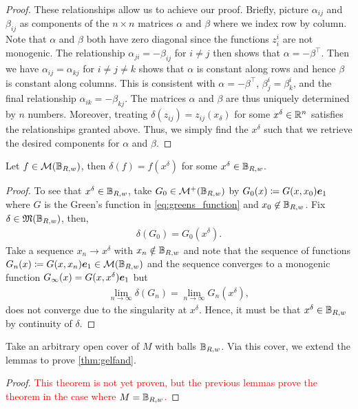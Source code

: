 \begin{proof}
These relationships allow us to achieve our proof. Briefly, picture $\alpha_{ij}$ and $\beta_{ij}$ as components of the $n \times n$ matrices $\alpha$ and $\beta$ where we index row by column. Note that $\alpha$ and $\beta$ both have zero diagonal since the functions $z_i^i$ are not monogenic. The relationship $\alpha_{ji} = -\beta_{ij}$ for $i\neq j$ then shows that $\alpha = -\beta^\top$.  Then we have $\alpha_{ij} = \alpha_{kj}$ for $i\neq j \neq k$ shows that $\alpha$ is constant along rows and hence $\beta$ is constant along columns. This is consistent with $\alpha = -\beta^\top$, $\beta_j^i = \beta_k^i$, and the final relationship $\alpha_{ik} = -\beta_{kj}$. The matrices $\alpha$ and $\beta$ are thus uniquely determined by $n$ numbers.  Moreover, treating $\delta(z_{ij})=z_{ij}(x_\delta)$ for some $x^\delta \in \mathbb{R}^n$ satisfies the relationships granted above. Thus, we simply find the $x^\delta$ such that we retrieve the desired components for $\alpha$ and $\beta$.  
\end{proof}


\begin{lemma}
Let $f\in \mathcal{M}(\mathbb{B}_{R,w})$, then $\delta(f)=f(x^\delta)$ for some $x^\delta \in \mathbb{B}_{R,w}$.
\end{lemma}
\begin{proof}
To see that $x^\delta \in \mathbb{B}_{R,w}$, take $G_0 \in \mathcal{M}^+(\mathbb{B}_{R,w})$ by $G_0(x)\coloneqq G(x,x_0)\boldsymbol{e}_1$ where $G$ is the Green's function in \cref{eq:greens_function} and $x_0\not\in \mathbb{B}_{R,w}$. Fix $\delta \in \mathfrak{M}(\mathbb{B}_{R,w})$, then, 
\begin{align}
\delta(G_0)=G_0(x^\delta).
\end{align}
Take a sequence $x_n \to x^\delta$ with $x_n \notin \mathbb{B}_{R,w}$ and note that the sequence of functions $G_n(x)\coloneqq G(x,x_n)\boldsymbol{e}_1 \in \mathcal{M}(\mathbb{B}_{R,w})$ and the sequence converges to a monogenic function $G_\infty(x) = G(x,x^\delta)\boldsymbol{e}_1$ but
\begin{align}
\lim_{n\to \infty} \delta(G_n) = \lim_{n\to \infty} G_n(x^\delta),
\end{align}
does not converge due to the singularity at $x^\delta$. Hence, it must be that $x^\delta \in \mathbb{B}_{R,w}$ by continuity of $\delta$.
\end{proof}

Take an arbitrary open cover of $M$ with balls $\mathbb{B}_{R,w}$. Via this cover, we extend the lemmas to prove \cref{thm:gelfand}.
\begin{proof}
\textcolor{red}{This theorem is not yet proven, but the previous lemmas prove the theorem in the case where $M= \mathbb{B}_{R,w}$.}
\end{proof}